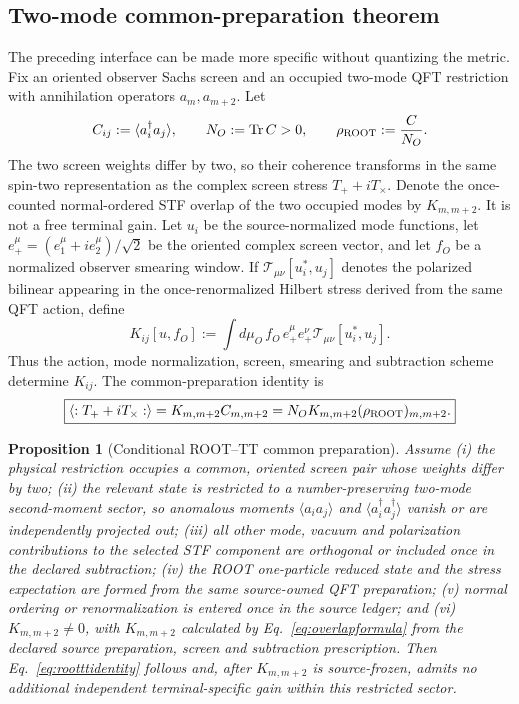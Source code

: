 \documentclass[11pt]{article}
\newtheorem{proposition}{Proposition}
\begin{document}
\subsection{Two-mode common-preparation theorem}

The preceding interface can be made more specific without quantizing the
metric.  Fix an oriented observer Sachs screen and an occupied two-mode QFT
restriction with annihilation operators $a_m,a_{m+2}$.  Let
\begin{equation}
C_{ij}:=\langle a_i^\dagger a_j\rangle,
\qquad
N_O:=\operatorname{Tr}C>0,
\qquad
\rho_{\rm ROOT}:=\frac{C}{N_O}.
\label{eq:rootdensity}
\end{equation}
The two screen weights differ by two, so their coherence transforms in the
same spin-two representation as the complex screen stress
$T_+ + iT_\times$.  Denote the once-counted normal-ordered STF overlap of the
two occupied modes by $K_{m,m+2}$.  It is not a free terminal gain.  Let
$u_i$ be the source-normalized mode functions, let
$e_+^\mu=(e_1^\mu+i e_2^\mu)/\sqrt{2}$ be the oriented complex screen vector,
and let $f_O$ be a normalized observer smearing window.  If
$\mathcal T_{\mu\nu}[u_i^*,u_j]$ denotes the polarized bilinear appearing in
the once-renormalized Hilbert stress derived from the same QFT action, define
\begin{equation}
K_{ij}[u,f_O]
:=\int d\mu_O\,f_O\,e_+^\mu e_+^\nu
\mathcal T_{\mu\nu}[u_i^*,u_j].
\label{eq:overlapformula}
\end{equation}
Thus the action, mode normalization, screen, smearing and subtraction scheme
determine $K_{ij}$.  The common-preparation identity is
\begin{equation}
\boxed{
\left\langle :T_+ + iT_\times: \right\rangle
=K_{m,m+2}C_{m,m+2}
=N_O K_{m,m+2}(\rho_{\rm ROOT})_{m,m+2}.}
\label{eq:rootttidentity}
\end{equation}

\begin{proposition}[Conditional ROOT--TT common preparation]
\label{prop:roottt}
Assume (i) the physical restriction occupies a common, oriented screen pair
whose weights differ by two; (ii) the relevant state is restricted to a
number-preserving two-mode second-moment sector, so anomalous moments
$\langle a_i a_j\rangle$ and $\langle a_i^\dagger a_j^\dagger\rangle$ vanish
or are independently projected out; (iii) all other mode, vacuum and
polarization contributions to the selected STF component are orthogonal or
included once in the declared subtraction; (iv) the ROOT one-particle reduced
state and the stress expectation are formed from the same source-owned QFT
preparation; (v) normal
ordering or renormalization is entered once in the source ledger; and (vi)
$K_{m,m+2}\neq0$, with $K_{m,m+2}$ calculated by
Eq.~\eqref{eq:overlapformula} from the declared source preparation, screen and
subtraction prescription.  Then Eq.~\eqref{eq:rootttidentity} follows and,
after $K_{m,m+2}$ is source-frozen, admits no additional independent
terminal-specific gain within this restricted sector.
\end{proposition}
\end{document}
